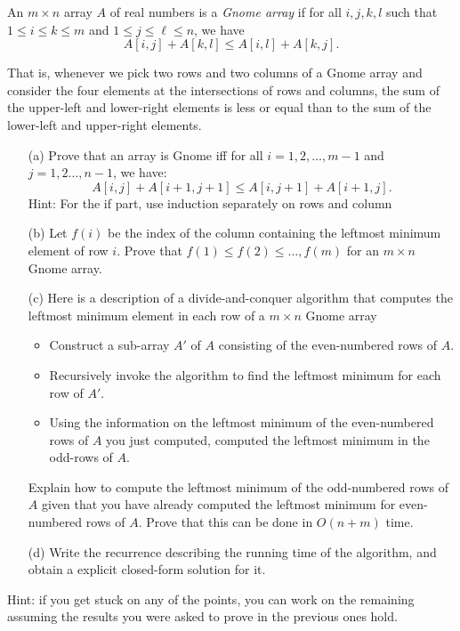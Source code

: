 \documentclass{common/cs157}
\begin{document}
\newpage
\begin{problem}{3}
An $m\times n$ array $A$ of real numbers is a \emph{Gnome array} if for all $i,j,k,l$ such that $1\leq i\leq k\leq m$ and $1\leq j\leq \ell\leq n$, we have
$$
A[i,j]+A[k,l]\leq A[i,l]+A[k,j].$$

That is, whenever we pick two rows and two columns of a Gnome array and consider the four elements at the intersections of rows and columns, the sum of the upper-left and lower-right elements is less or equal than to the sum of the lower-left and upper-right elements.

\begin{enumerate}
\item[(a)] Prove that an array is Gnome iff for all $i=1,2,\ldots, m-1$ and $j=1,2\dots, n-1$, we have:
$$
A[i,j]+A[i+1,j+1] \leq A[i,j+1]+A[i+1,j].
$$
Hint: For the if part, use induction separately on rows and column
\item[(b)] Let $f(i)$ be the index of the column containing the leftmost minimum element of row $i$. Prove that $f(1)\leq f(2)\leq \ldots, f(m)$ for an $m \times n$ Gnome array.
    \item[(c)]Here is a description of a divide-and-conquer algorithm that computes the leftmost minimum element in each row of a $m\times n$ Gnome array
    \begin{itemize}
        \item Construct a sub-array $A'$ of $A$ consisting of the even-numbered rows of $A$. 
        \item Recursively invoke the algorithm to find the leftmost minimum for each row of $A'$.
        \item Using the information on the leftmost minimum of the even-numbered rows of $A$ you just computed, computed the leftmost minimum in the odd-rows of $A$. 
    \end{itemize}
    Explain how to compute the leftmost minimum of the odd-numbered rows of $A$ given that you have already computed the leftmost minimum for even-numbered rows of $A$. Prove that this can be done in $O(n+m)$ time.
    \item[(d)] Write the recurrence describing the running time of the algorithm, and obtain a explicit closed-form solution for it.
\end{enumerate}

Hint: if you get stuck on any of the points, you can work on the remaining assuming the results you were asked to prove in the previous ones hold.
\end{problem}
\end{document}
